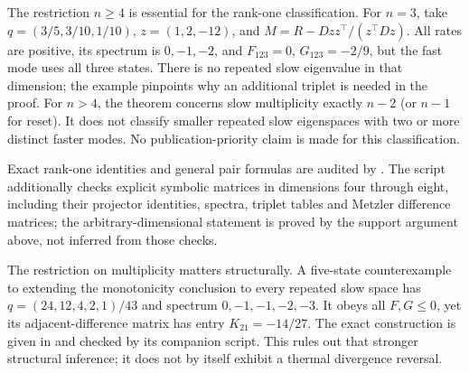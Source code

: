 The restriction $n\geq4$ is essential for the rank-one classification.
For $n=3$, take $q=(3/5,3/10,1/10)$, $z=(1,2,-12)$, and
$M=R-Dzz^\top/(z^\top Dz)$. All rates are positive, its spectrum is
$0,-1,-2$, and $F_{123}=0$, $G_{123}=-2/9$, but the fast mode uses
all three states. There is no repeated slow eigenvalue in that dimension;
the example pinpoints why an additional triplet is needed in the proof.
For $n>4$, the theorem concerns slow multiplicity exactly $n-2$ (or
$n-1$ for reset). It does not classify smaller repeated slow eigenspaces
with two or more distinct faster modes. No publication-priority claim
is made for this classification.

Exact rank-one identities and general pair formulas are audited by
. The script additionally
checks explicit symbolic matrices in dimensions four through eight,
including their projector identities, spectra, triplet tables and
Metzler difference matrices; the arbitrary-dimensional statement is
proved by the support argument above, not inferred from those checks.

The restriction on multiplicity matters structurally. A five-state
counterexample to extending the monotonicity conclusion to every repeated
slow space has $q=(24,12,4,2,1)/43$ and spectrum
$0,-1,-1,-2,-3$. It obeys all $F,G\leq0$, yet its adjacent-difference
matrix has entry $K_{21}=-14/27$. The exact construction is given in
 and checked by its
companion script. This rules out that stronger structural inference;
it does not by itself exhibit a thermal divergence reversal.
